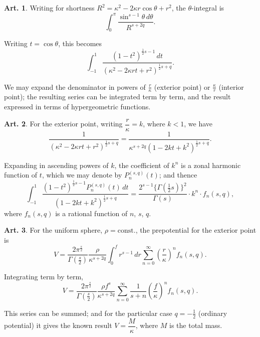 \documentclass[12pt,a4paper]{article}
\theoremstyle{definition}
\newtheorem{art}{Art.}[section]
\begin{document}
\begin{art}\label{art:65}
Writing for shortness $R^2 = \kappa^2 - 2\kappa r\cos\theta + r^2$, the $\theta$-integral is
\[
\int_0^\pi \frac{\sin^{s-1}\theta \, d\theta}{R^{s+2q}}.
\]

Writing $t = \cos\theta$, this becomes
\[
\int_{-1}^1 \frac{(1-t^2)^{\frac{1}{2}s-1} \, dt}{(\kappa^2 - 2\kappa rt + r^2)^{\frac{1}{2}s+q}}.
\]

We may expand the denominator in powers of $\frac{r}{\kappa}$ (exterior point) or $\frac{\kappa}{r}$ (interior point); the resulting series can be integrated term by term, and the result expressed in terms of hypergeometric functions.
\end{art}

\begin{art}\label{art:66}
For the exterior point, writing $\dfrac{r}{\kappa} = k$, where $k < 1$, we have
\[
\frac{1}{(\kappa^2 - 2\kappa rt + r^2)^{\frac{1}{2}s+q}} = \frac{1}{\kappa^{s+2q}(1 - 2kt + k^2)^{\frac{1}{2}s+q}}.
\]

Expanding in ascending powers of $k$, the coefficient of $k^n$ is a zonal harmonic function of $t$, which we may denote by $P_n^{(s,q)}(t)$; and thence
\[
\int_{-1}^1 \frac{(1-t^2)^{\frac{1}{2}s-1} P_n^{(s,q)}(t) \, dt}{(1-2kt+k^2)^{\frac{1}{2}s+q}} = \frac{2^{s-1}\{\Gamma(\frac{1}{2}s)\}^2}{\Gamma(s)} \cdot k^n \cdot f_n(s,q),
\]
where $f_n(s,q)$ is a rational function of $n$, $s$, $q$.
\end{art}

\begin{art}\label{art:67}
For the uniform sphere, $\rho = \text{const.}$, the prepotential for the exterior point is
\[
V = \frac{2\pi^{\frac{s}{2}}}{\Gamma(\frac{s}{2})} \frac{\rho}{\kappa^{s+2q}} \int_0^f r^{s-1} \, dr \sum_{n=0}^\infty \left(\frac{r}{\kappa}\right)^n f_n(s,q).
\]

Integrating term by term,
\[
V = \frac{2\pi^{\frac{s}{2}}}{\Gamma(\frac{s}{2})} \frac{\rho f^s}{\kappa^{s+2q}} \sum_{n=0}^\infty \frac{1}{s+n} \left(\frac{f}{\kappa}\right)^n f_n(s,q).
\]

This series can be summed; and for the particular case $q = -\tfrac{1}{2}$ (ordinary potential) it gives the known result $V = \dfrac{M}{\kappa}$, where $M$ is the total mass.
\end{art}
\end{document}
